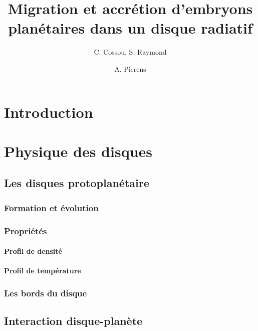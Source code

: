\documentclass[a4paper,twoside]{book}
\title{Migration et accrétion d'embryons planétaires dans un disque radiatif}
\author{C. Cossou, S. Raymond \and A. Pierens}
\begin{document}
\tableofcontents
\newpage



\chapter{Introduction}




\chapter{Physique des disques}
\section{Les disques protoplanétaire}
\subsection{Formation et évolution}
\subsection{Propriétés}
\subsubsection{Profil de densité}
\subsubsection{Profil de température}

\subsection{Les bords du disque}

\section{Interaction disque-planète}
\end{document}

